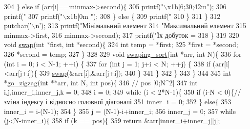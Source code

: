 \begin{DoxyCodeInclude}
{{{{{{{304         \} \textcolor{keywordflow}{else} \textcolor{keywordflow}{if} (arr[i]==minmax->second)\{
305             printf(\textcolor{stringliteral}{"\(\backslash\)x1b[6;30;42m"});
306             printf(\textcolor{stringliteral}{"%
307             printf(\textcolor{stringliteral}{"\(\backslash\)x1b[0m "});
308         \} \textcolor{keywordflow}{else} \{
309             printf(\textcolor{stringliteral}{"%
310         \}
311     \}
312     putchar(\textcolor{charliteral}{'\(\backslash\)n'});
313     printf(\textcolor{stringliteral}{"Мінімальний елемент %
314            \textcolor{stringliteral}{"Максимальний елемент %
315            minmax->first,
316            minmax->second);
317     printf(\textcolor{stringliteral}{"Їх добуток = %
318 \}
319 
320 \textcolor{keywordtype}{void} \hyperlink{main_8c_ad126fa7239be97373c96861adc70b1d3}{swap}(\textcolor{keywordtype}{int} *first, \textcolor{keywordtype}{int} *second)\{
324     \textcolor{keywordtype}{int} temp = *first;
325     *first = *second;
326     *second = temp;
327 \}
328 
329 \textcolor{keywordtype}{void} \hyperlink{main_8c_a6d948aa7c7e64009c7446e8010368f74}{swaping\_sort}(\textcolor{keywordtype}{int} *arr, \textcolor{keywordtype}{int} N)\{
336     \textcolor{keywordflow}{for} (\textcolor{keywordtype}{int} i = 0; i < N-1; ++i) \{
337         \textcolor{keywordflow}{for} (\textcolor{keywordtype}{int} j = 1; j+i < N; ++j) \{
338             \textcolor{keywordflow}{if} (arr[i]<arr[j+i])\{
339                 \hyperlink{main_8c_ad126fa7239be97373c96861adc70b1d3}{swap}(&arr[i],&arr[j+i]);
340             \}
341         \}
342     \}
343 \}
344 
345 \textcolor{keywordtype}{int} *\hyperlink{main_8c_a136eda0783a1b3202fbf6330967acec0}{go\_zigzag}(\textcolor{keywordtype}{int} **arr, \textcolor{keywordtype}{int} N, \textcolor{keywordtype}{int} pos)\{
346     \textcolor{comment}{// pos [0;N^2]}
347     \textcolor{keywordtype}{int} i,j,inner\_i,inner\_j,k = 0;
348     i = 0;
349     \textcolor{keywordflow}{while} (i < 2*N-1)\{
350         \textcolor{keywordflow}{if} (i-N < 0)\{\textcolor{comment}{//зміна індексу і відносно головної діагоналі}
351             inner\_i = 0;
352         \} \textcolor{keywordflow}{else}\{
353             inner\_i = i-(N-1);
354         \}
355         j = (N-1)-i+inner\_i;
356         inner\_j = 0;
357         \textcolor{keywordflow}{while} (j<N-inner\_i)\{
358             \textcolor{keywordflow}{if} (k == pos)\{
359                 \textcolor{keywordflow}{return} &arr[inner\_i+inner\_j][j];
}}}}}}}}}}}}
\end{DoxyCodeInclude}
